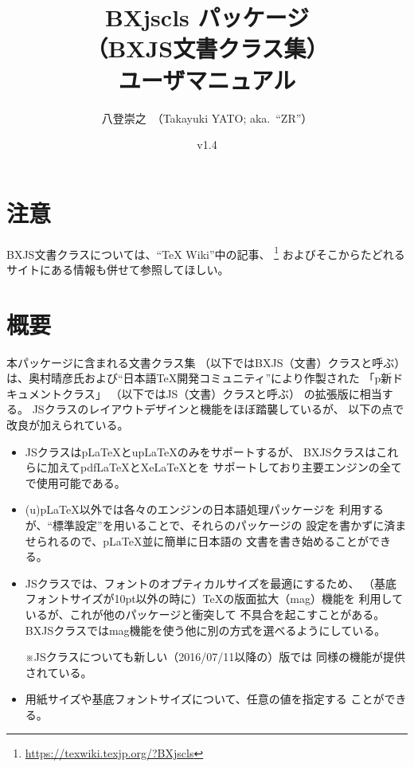 \documentclass[a4paper]{ltjsarticle}
\renewcommand*{\XeLaTeX}{XeLaTeX}}
\newcommand{\PkgVersion}{1.4}
\newcommand{\PkgDate}{2017/02/03}
\newcommand{\Pkg}[1]{\textsf{#1}}
\newcommand{\Note}{\par\noindent ※}
\newcommand{\jemph}{\textsf}
\providecommand{\pLaTeX}{p\LaTeX}
\providecommand{\upLaTeX}{u\pLaTeX}
\providecommand{\pdfLaTeX}{pdf\LaTeX}
\begin{document}
\title{\Pkg{BXjscls} パッケージ\\
  （BXJS文書クラス集）\\
  ユーザマニュアル}
\author{八登崇之\ （Takayuki YATO; aka.~``ZR''）}
\date{v\PkgVersion\quad[\PkgDate]}
\maketitle
\tableofcontents

\section*{注意}

BXJS文書クラスについては、“{\TeX} Wiki”中の記事、
\footnote{\url{https://texwiki.texjp.org/?BXjscls}}%
およびそこからたどれるサイトにある情報も併せて参照してほしい。

\section{概要}
\label{sec:Ovewview}

本パッケージに含まれる文書クラス集
（以下では\jemph{BXJS（文書）クラス}と呼ぶ）
は、奥村晴彦氏および“日本語{\TeX}開発コミュニティ”により作製された
「p{\LaTeXe}新ドキュメントクラス」
（以下では\jemph{JS（文書）クラス}と呼ぶ）
の拡張版に相当する。
JSクラスのレイアウトデザインと機能をほぼ踏襲しているが、
以下の点で改良が加えられている。
\begin{itemize}
\item JSクラスは{\pLaTeX}と{\upLaTeX}のみをサポートするが、
  BXJSクラスはこれらに加えて{\pdfLaTeX}と{\XeLaTeX}と{\LuaLaTeX}を
  サポートしており主要エンジンの全てで使用可能である。
\item (u){\pLaTeX}以外では各々のエンジンの日本語処理パッケージを
  利用するが、“標準設定”を用いることで、それらのパッケージの
  設定を書かずに済ませられるので、{\pLaTeX}並に簡単に日本語の
  文書を書き始めることができる。
\item JSクラスでは、フォントのオプティカルサイズを最適にするため、
  （基底フォントサイズが10pt以外の時に）{\TeX}の版面拡大（mag）機能を
  利用しているが、これが他のパッケージと衝突して
  不具合を起こすことがある。
  BXJSクラスではmag機能を使う他に別の方式を選べるようにしている。
  \Note JSクラスについても新しい（2016/07/11以降の）版では
  同様の機能が提供されている。
\item 用紙サイズや基底フォントサイズについて、任意の値を指定する
  ことができる。
\end{itemize}
\end{document}
